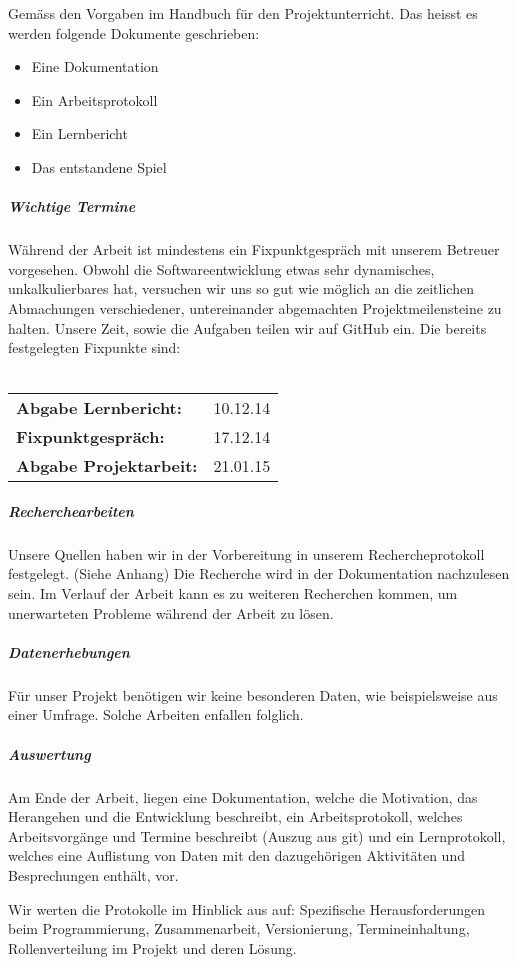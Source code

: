 \documentclass[parskip=half]{scrreprt}
\begin{document}
\begin{contract}
Gemäss den Vorgaben im Handbuch für den Projektunterricht. Das heisst es werden folgende Dokumente geschrieben:
\begin{itemize}
\item Eine Dokumentation
\item Ein Arbeitsprotokoll
\item Ein Lernbericht
\item Das entstandene Spiel
\end{itemize}

\subparagraph{Wichtige Termine}
Während der Arbeit ist mindestens ein Fixpunktgespräch mit unserem Betreuer vorgesehen. Obwohl die Softwareentwicklung etwas sehr dynamisches, unkalkulierbares hat, versuchen wir uns so gut wie möglich an die zeitlichen Abmachungen verschiedener, untereinander abgemachten Projektmeilensteine zu halten. Unsere Zeit, sowie die Aufgaben teilen wir auf GitHub ein. Die bereits festgelegten Fixpunkte sind:
\\\\
\begin{tabular}{ll}
\textbf{Abgabe Lernbericht:} & 10.12.14\\
\textbf{Fixpunktgespräch:} & 17.12.14\\
\textbf{Abgabe Projektarbeit:} & 21.01.15
\end{tabular}

\subparagraph{Recherchearbeiten}
Unsere Quellen haben wir in der Vorbereitung in unserem Rechercheprotokoll festgelegt. (Siehe Anhang) Die Recherche wird in der Dokumentation nachzulesen sein. Im Verlauf der Arbeit kann es zu weiteren Recherchen kommen, um unerwarteten Probleme während der Arbeit zu lösen.

\subparagraph{Datenerhebungen}
Für unser Projekt benötigen wir keine besonderen Daten, wie beispielsweise aus einer Umfrage. Solche Arbeiten
enfallen folglich.

\subparagraph{Auswertung}
Am Ende der Arbeit, liegen eine Dokumentation, welche die Motivation, das Herangehen und die Entwicklung beschreibt, ein Arbeitsprotokoll, welches Arbeitsvorgänge und Termine beschreibt (Auszug aus git) und ein Lernprotokoll, welches eine Auflistung von Daten mit den dazugehörigen Aktivitäten und Besprechungen enthält, vor. 

Wir werten die Protokolle im Hinblick aus auf: Spezifische Herausforderungen beim Programmierung, Zusammenarbeit, Versionierung, Termineinhaltung, Rollenverteilung im Projekt und deren Lösung.


\end{contract}
\end{document}
